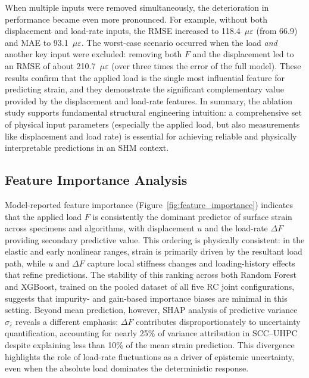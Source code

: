 \documentclass{article}
\begin{document}
When multiple inputs were removed simultaneously, the deterioration in performance became even more pronounced. For example, without both displacement and load-rate inputs, the RMSE increased to 118.4~$\mu\varepsilon$ (from 66.9) and MAE to 93.1~$\mu\varepsilon$. The worst-case scenario occurred when the load \emph{and} another key input were excluded: removing both $F$ and the displacement led to an RMSE of about 210.7~$\mu\varepsilon$ (over three times the error of the full model). These results confirm that the applied load is the single most influential feature for predicting strain, and they demonstrate the significant complementary value provided by the displacement and load-rate features. In summary, the ablation study supports fundamental structural engineering intuition: a comprehensive set of physical input parameters (especially the applied load, but also measurements like displacement and load rate) is essential for achieving reliable and physically interpretable predictions in an SHM context.



\subsection{Feature Importance Analysis}
\label{subsec:feature_importance}

Model-reported feature importance (Figure~\ref{fig:feature_importance}) indicates that the applied load $F$ is consistently the dominant predictor of surface strain across specimens and algorithms, with displacement $u$ and the load-rate $\Delta F$ providing secondary predictive value. This ordering is physically consistent: in the elastic and early nonlinear ranges, strain is primarily driven by the resultant load path, while $u$ and $\Delta F$ capture local stiffness changes and loading-history effects that refine predictions. The stability of this ranking across both Random Forest and XGBoost, trained on the pooled dataset of all five RC joint configurations, suggests that impurity- and gain-based importance biases are minimal in this setting. Beyond mean prediction, however, SHAP analysis of predictive variance $\sigma_{\hat{\varepsilon}}$ reveals a different emphasis: $\Delta F$ contributes disproportionately to uncertainty quantification, accounting for nearly 25\% of variance attribution in SCC–UHPC despite explaining less than 10\% of the mean strain prediction. This divergence highlights the role of load-rate fluctuations as a driver of epistemic uncertainty, even when the absolute load dominates the deterministic response.
\end{document}
